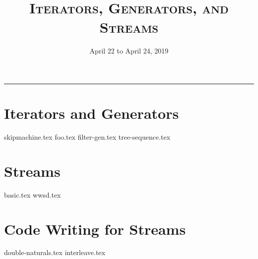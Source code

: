 \documentclass{exam}
\title{\textsc{Iterators, Generators, and Streams}}
\date{April 22 to April 24, 2019}
\begin{document}
\maketitle\rule{\textwidth}{0.15em}
\fontsize{12}{15}\selectfont

\section{Iterators and Generators}
\begin{questions}
{skipmachine.tex}
{foo.tex}
{filter-gen.tex}
{tree-sequence.tex}
\end{questions}
\section{Streams}
\begin{questions}
{basic.tex}
\newpage
{wwsd.tex}
\end{questions}
\section{Code Writing for Streams}
\begin{questions}
{double-naturals.tex}
{interleave.tex}
\end{questions}
\end{document}
